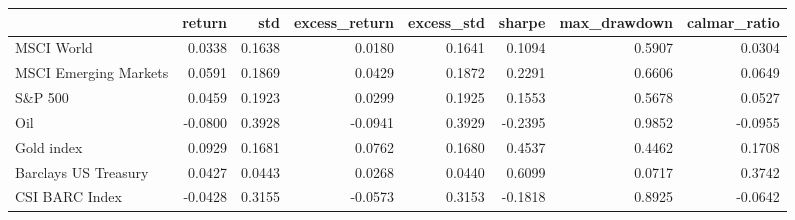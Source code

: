 \begin{tabular}{lrrrrrrr}
\toprule
{} &  return &     std &  excess\_return &  excess\_std &  sharpe &  max\_drawdown &  calmar\_ratio \\
\midrule
MSCI World            &  0.0338 &  0.1638 &         0.0180 &      0.1641 &  0.1094 &        0.5907 &        0.0304 \\
MSCI Emerging Markets &  0.0591 &  0.1869 &         0.0429 &      0.1872 &  0.2291 &        0.6606 &        0.0649 \\
S\&P 500               &  0.0459 &  0.1923 &         0.0299 &      0.1925 &  0.1553 &        0.5678 &        0.0527 \\
Oil                   & -0.0800 &  0.3928 &        -0.0941 &      0.3929 & -0.2395 &        0.9852 &       -0.0955 \\
Gold index            &  0.0929 &  0.1681 &         0.0762 &      0.1680 &  0.4537 &        0.4462 &        0.1708 \\
Barclays US Treasury  &  0.0427 &  0.0443 &         0.0268 &      0.0440 &  0.6099 &        0.0717 &        0.3742 \\
CSI BARC Index        & -0.0428 &  0.3155 &        -0.0573 &      0.3153 & -0.1818 &        0.8925 &       -0.0642 \\
\bottomrule
\end{tabular}
